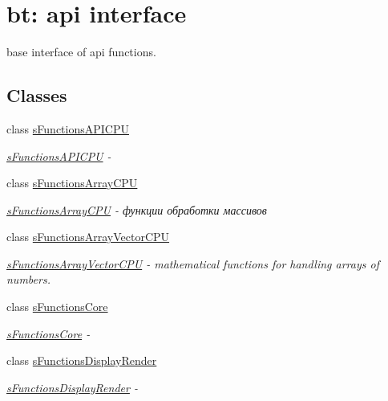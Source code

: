 \hypertarget{group__apiinterface}{\section{bt\-: api interface}
\label{group__apiinterface}
}


base interface of api functions.  


\subsection*{Classes}
\begin{DoxyCompactItemize}
\item 
class \hyperlink{structs_functions_a_p_i_c_p_u}{s\-Functions\-A\-P\-I\-C\-P\-U}
\begin{DoxyCompactList}\small\item\em \hyperlink{structs_functions_a_p_i_c_p_u}{s\-Functions\-A\-P\-I\-C\-P\-U} -\/ \end{DoxyCompactList}\item 
class \hyperlink{structs_functions_array_c_p_u}{s\-Functions\-Array\-C\-P\-U}
\begin{DoxyCompactList}\small\item\em \hyperlink{structs_functions_array_c_p_u}{s\-Functions\-Array\-C\-P\-U} -\/ функции обработки массивов \end{DoxyCompactList}\item 
class \hyperlink{structs_functions_array_vector_c_p_u}{s\-Functions\-Array\-Vector\-C\-P\-U}
\begin{DoxyCompactList}\small\item\em \hyperlink{structs_functions_array_vector_c_p_u}{s\-Functions\-Array\-Vector\-C\-P\-U} -\/ mathematical functions for handling arrays of numbers. \end{DoxyCompactList}\item 
class \hyperlink{structs_functions_core}{s\-Functions\-Core}
\begin{DoxyCompactList}\small\item\em \hyperlink{structs_functions_core}{s\-Functions\-Core} -\/ \end{DoxyCompactList}\item 
class \hyperlink{structs_functions_display_render}{s\-Functions\-Display\-Render}
\begin{DoxyCompactList}\small\item\em \hyperlink{structs_functions_display_render}{s\-Functions\-Display\-Render} -\/ \end{DoxyCompactList}\item 

\end{DoxyCompactItemize}
